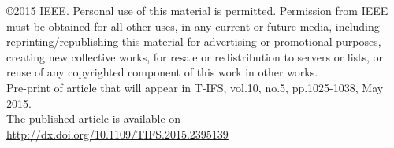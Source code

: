\documentclass[journal,onecolumn,12pt]{IEEEtran}
\begin{document}
\noindent \copyright 2015 IEEE. Personal use of this material is permitted. Permission from IEEE must be obtained for all other uses, in any current or future media, including reprinting/republishing this material for advertising or promotional purposes, creating new collective works, for resale or redistribution to servers or lists, or reuse of any copyrighted component of this work in other works.
\\

\noindent Pre-print of article that will appear in T-IFS, vol.10, no.5, pp.1025-1038, May 2015.
\\

\noindent The published article is available on \url{http://dx.doi.org/10.1109/TIFS.2015.2395139}


\end{document}
